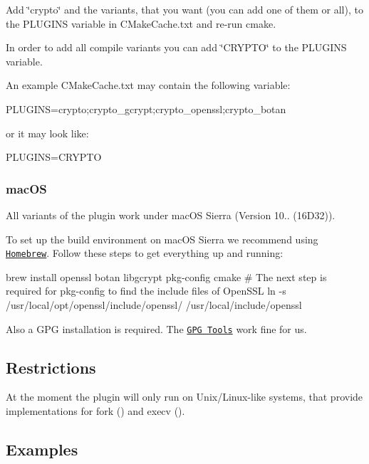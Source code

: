 Add \char`\"{}crypto\char`\"{} and the variants, that you want (you can add one of them or all), to the {\ttfamily P\+L\+U\+G\+I\+NS} variable in {\ttfamily C\+Make\+Cache.\+txt} and re-\/run {\ttfamily cmake}.

In order to add all compile variants you can add \char`\"{}\+C\+R\+Y\+P\+T\+O\char`\"{} to the {\ttfamily P\+L\+U\+G\+I\+NS} variable.

An example {\ttfamily C\+Make\+Cache.\+txt} may contain the following variable\+:


\begin{DoxyCode}
PLUGINS=crypto;crypto\_gcrypt;crypto\_openssl;crypto\_botan
\end{DoxyCode}


or it may look like\+:


\begin{DoxyCode}
PLUGINS=CRYPTO
\end{DoxyCode}


\subsubsection*{mac\+OS}

All variants of the plugin work under mac\+OS Sierra (Version 10.. (16\+D32)).

To set up the build environment on mac\+OS Sierra we recommend using \href{http://brew.sh/}{\tt Homebrew}. Follow these steps to get everything up and running\+:


\begin{DoxyCode}
brew install openssl botan libgcrypt pkg-config cmake
# The next step is required for pkg-config to find the include files of OpenSSL
ln -s /usr/local/opt/openssl/include/openssl/ /usr/local/include/openssl
\end{DoxyCode}


Also a G\+PG installation is required. The \href{https://gpgtools.org}{\tt G\+PG Tools} work fine for us.

\subsection*{Restrictions}

At the moment the plugin will only run on Unix/\+Linux-\/like systems, that provide implementations for {\ttfamily fork ()} and {\ttfamily execv ()}.

\subsection*{Examples}

